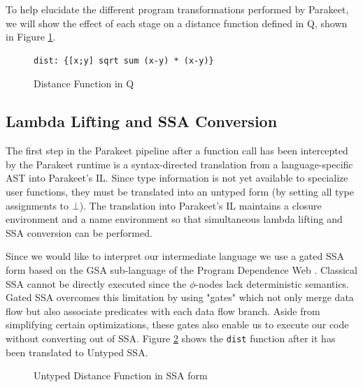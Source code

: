 \documentclass[preprint]{sigplanconf}
\begin{document}
To help elucidate the different program transformations performed by Parakeet,
we will show the effect of each stage on a distance function defined in Q,
shown in Figure \ref{QDist}.

\begin{figure}[h!]
    \begin{lstlisting}[numbers=none]
    dist: {[x;y] sqrt sum (x-y) * (x-y)}
    \end{lstlisting}
    \caption{Distance Function in Q}
    \label{QDist}
\end{figure}

\subsection{Lambda Lifting and SSA Conversion } 
The first step in the Parakeet pipeline after a function call has been
intercepted by the Parakeet runtime is a syntax-directed translation from a
language-specific AST into Parakeet's IL. Since type information is not yet
available to specialize user functions, they must be translated into an untyped
form (by setting all type assignments to $\bot$). The translation into
Parakeet's IL maintains a closure environment and a name environment so that
simultaneous lambda lifting and SSA conversion can be performed.

Since we would like to interpret our intermediate language we use a gated SSA
form based on the GSA sub-language of the Program Dependence Web \cite{Ott90}.
Classical SSA cannot be directly executed since the $\phi$-nodes lack
deterministic semantics. Gated SSA overcomes this limitation by using "gates"
which not only merge data flow but also associate predicates with each data flow
branch. Aside from simplifying certain optimizations, these gates also enable us
to execute our code without converting out of SSA.  Figure \ref{UntypedSSADist}
shows the \texttt{dist} function after it has been translated to Untyped SSA.

\begin{figure}[h!]
\caption{Untyped Distance Function in SSA form}
\label{UntypedSSADist}
\end{figure}
\end{document}

